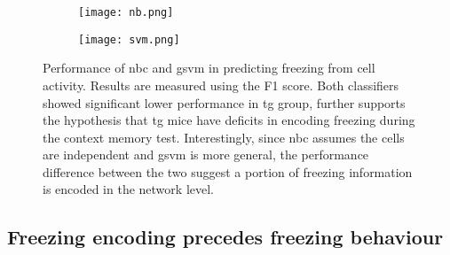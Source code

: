 
\begin{figure}[h]
    \begin{subfigure}[h]{\textwidth}
        \texttt{[image: nb.png]}
        \caption{\label{f.ad.nb}}
    \end{subfigure}
    \begin{subfigure}[h]{\textwidth}
        \texttt{[image: svm.png]}
        \caption{\label{f.ad.svm}}
    \end{subfigure}
    \caption{Performance of  \gls{nbc} and  \gls{gsvm} in predicting freezing from cell activity. Results are measured  using the F1 score. Both classifiers showed significant lower performance in \gls{tg} group, further supports the hypothesis that \gls{tg} mice have deficits in encoding freezing during the context memory test. Interestingly, since \gls{nbc} assumes the cells are independent and \gls{gsvm} is more general, the performance difference between the two suggest a portion of freezing information is encoded in the network level. \label{f.ad.classifier}}
\end{figure}


\subsection{Freezing encoding precedes freezing behaviour}


